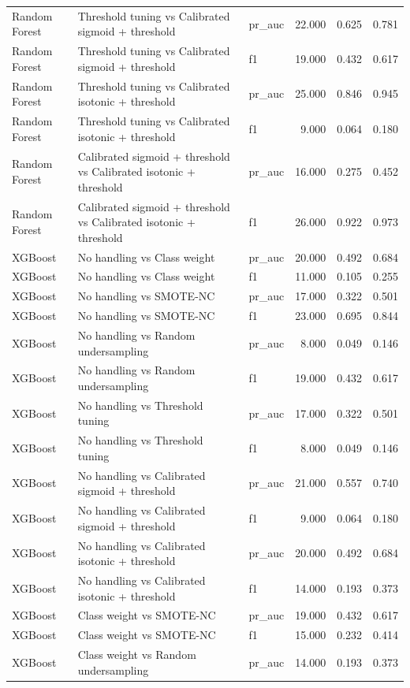 \begin{tabular}{lllrrr}
Random Forest & Threshold tuning vs Calibrated sigmoid + threshold & pr_auc & 22.000 & 0.625 & 0.781 \\
Random Forest & Threshold tuning vs Calibrated sigmoid + threshold & f1 & 19.000 & 0.432 & 0.617 \\
Random Forest & Threshold tuning vs Calibrated isotonic + threshold & pr_auc & 25.000 & 0.846 & 0.945 \\
Random Forest & Threshold tuning vs Calibrated isotonic + threshold & f1 & 9.000 & 0.064 & 0.180 \\
Random Forest & Calibrated sigmoid + threshold vs Calibrated isotonic + threshold & pr_auc & 16.000 & 0.275 & 0.452 \\
Random Forest & Calibrated sigmoid + threshold vs Calibrated isotonic + threshold & f1 & 26.000 & 0.922 & 0.973 \\
XGBoost & No handling vs Class weight & pr_auc & 20.000 & 0.492 & 0.684 \\
XGBoost & No handling vs Class weight & f1 & 11.000 & 0.105 & 0.255 \\
XGBoost & No handling vs SMOTE-NC & pr_auc & 17.000 & 0.322 & 0.501 \\
XGBoost & No handling vs SMOTE-NC & f1 & 23.000 & 0.695 & 0.844 \\
XGBoost & No handling vs Random undersampling & pr_auc & 8.000 & 0.049 & 0.146 \\
XGBoost & No handling vs Random undersampling & f1 & 19.000 & 0.432 & 0.617 \\
XGBoost & No handling vs Threshold tuning & pr_auc & 17.000 & 0.322 & 0.501 \\
XGBoost & No handling vs Threshold tuning & f1 & 8.000 & 0.049 & 0.146 \\
XGBoost & No handling vs Calibrated sigmoid + threshold & pr_auc & 21.000 & 0.557 & 0.740 \\
XGBoost & No handling vs Calibrated sigmoid + threshold & f1 & 9.000 & 0.064 & 0.180 \\
XGBoost & No handling vs Calibrated isotonic + threshold & pr_auc & 20.000 & 0.492 & 0.684 \\
XGBoost & No handling vs Calibrated isotonic + threshold & f1 & 14.000 & 0.193 & 0.373 \\
XGBoost & Class weight vs SMOTE-NC & pr_auc & 19.000 & 0.432 & 0.617 \\
XGBoost & Class weight vs SMOTE-NC & f1 & 15.000 & 0.232 & 0.414 \\
XGBoost & Class weight vs Random undersampling & pr_auc & 14.000 & 0.193 & 0.373 \\

\end{tabular}
